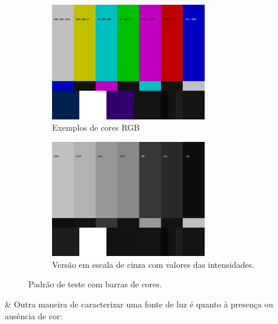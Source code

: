 \begin{easylist}
  \begin{figure}[!t]
  \begin{subfigure}{1\textwidth}
    \centering
    \includegraphics[width=0.75\textwidth]{images/06/SMPTE_Color_Bars_RGB.png}
    \caption{\label{fig:bright:rgb} Exemplos de cores RGB}
  \end{subfigure}
  \begin{subfigure}{1\textwidth}
    \centering
    \includegraphics[width=0.75\textwidth]{images/06/SMPTE_Color_Bars_gray.png}
    \caption{\label{fig:bright:gray} Versão em escala de cinza com valores das intensidades.}
  \end{subfigure}
  \caption{\label{fig:bright} Padrão de teste com barras de cores.}
  \end{figure}


  


  
  \vspace{.5cm}

  & Outra maneira de caracterizar uma fonte de luz é quanto à presença ou ausência de cor:


\end{easylist}
